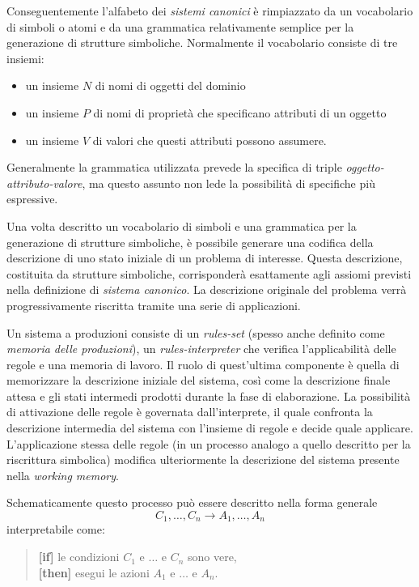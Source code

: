 Conseguentemente l'alfabeto dei \emph{sistemi canonici} è rimpiazzato da un vocabolario di simboli o atomi e da una grammatica relativamente semplice per la generazione di strutture simboliche. Normalmente il vocabolario consiste di tre insiemi:

\begin{itemize}
	\item un insieme $N$ di nomi di oggetti del dominio
	\item un insieme $P$ di nomi di proprietà che specificano attributi di un oggetto
	\item un insieme $V$ di valori che questi attributi possono assumere.
\end{itemize}

Generalmente la grammatica utilizzata prevede la specifica di triple \emph{oggetto-attributo-valore}, ma questo assunto non lede la possibilità di specifiche più espressive. \cite{jackson1999}

Una volta descritto un vocabolario di simboli e una grammatica per la generazione di strutture simboliche, è possibile generare una codifica della descrizione di uno stato iniziale di un problema di interesse. Questa descrizione, costituita da strutture simboliche, corrisponderà esattamente agli assiomi previsti nella definizione di \emph{sistema canonico}. La descrizione originale del problema verrà progressivamente riscritta tramite una serie di applicazioni.

Un sistema a produzioni consiste di un \emph{rules-set} (spesso anche definito come \emph{memoria delle produzioni}), un \emph{rules-interpreter} che verifica l'applicabilità delle regole e una memoria di lavoro. Il ruolo di quest'ultima componente è quella di memorizzare la descrizione iniziale del sistema, così come la descrizione finale attesa e gli stati intermedi prodotti durante la fase di elaborazione. La possibilità di attivazione delle regole è governata dall'interprete, il quale confronta la descrizione intermedia del sistema con l'insieme di regole e decide quale applicare. L'applicazione stessa delle regole (in un processo analogo a quello descritto per la riscrittura simbolica) modifica ulteriormente la descrizione del sistema presente nella \emph{working memory}.

Schematicamente questo processo può essere descritto nella forma generale
\[
C_1, \dots, C_n \rightarrow A_1, \dots, A_n
\]
interpretabile come:
\begin{quote}
	{\bfseries [if]} le condizioni $C_1$ e $\dots$ e $C_n$ sono vere,\\
	{\bfseries [then]} esegui le azioni $A_1$ e $\dots$ e $A_n$.
\end{quote}

